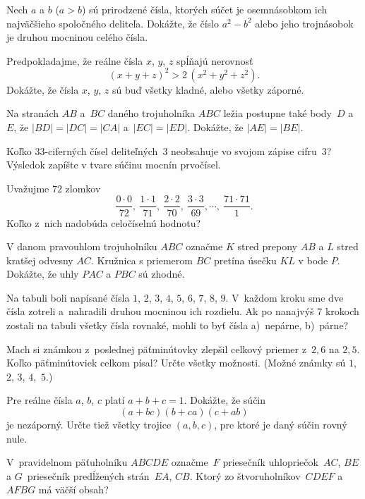 {%
Nech $a$ a $b$ ($a>b$) sú prirodzené čísla, ktorých súčet je osemnásobkom ich najväčšieho spoločného deliteľa. Dokážte, že číslo $a^2-b^2$ alebo jeho trojnásobok je druhou mocninou celého čísla.}

{%
Predpokladajme, že reálne čísla $x$, $y$, $z$ spĺňajú nerovnosť
$$
(x+y+z)^2>2\,(x^2+y^2+z^2).
$$
Dokážte, že čísla $x$, $y$, $z$ sú buď všetky kladné, alebo všetky
záporné.}

{%
Na stranách $AB$ a~$BC$ daného trojuholníka $ABC$ ležia postupne také body~$D$ a~$E$, že $|BD|=|DC|=|CA|$ a~$|EC|=|ED|$. Dokážte, že $|AE|=|BE|$.}

{%
Koľko $33$-ciferných čísel deliteľných~$3$ neobsahuje vo svojom zápise cifru~3? Výsledok zapíšte v tvare súčinu mocnín prvočísel.}

{%
Uvažujme $72$ zlomkov
$$ \frac{0\cdot 0}{72},\ \frac{1\cdot 1}{71},\ \frac{2\cdot 2}{70},\ \frac{3\cdot 3}{69}, \cdots,\ \frac{71\cdot 71}{1}.
$$
Koľko z~nich nadobúda celočíselnú hodnotu?}

{%
V danom pravouhlom trojuholníku $ABC$ označme $K$ stred prepony $AB$ a $L$ stred kratšej odvesny $AC$. Kružnica s priemerom $BC$ pretína úsečku $KL$ v bode $P$. Dokážte, že uhly $PAC$ a $PBC$ sú zhodné.}

{%
Na tabuli boli napísané čísla $1$, $2$, $3$, $4$, $5$, $6$, $7$, $8$, $9$. V~každom kroku sme dve čísla zotreli a~nahradili druhou mocninou ich rozdielu. Ak po nanajvýš 7 krokoch zostali na tabuli všetky čísla rovnaké, mohli to byť čísla
a)~nepárne, b)~párne?}

{%
Mach si známkou z~poslednej päťminútovky zlepšil celkový priemer z~$2{,}6$ na $2{,}5$. Koľko päťminútoviek celkom písal? Určte všetky možnosti. (Možné známky sú $1$, $2$, $3$, $4$,~$5$.)}

{%
Pre reálne čísla $a$, $b$, $c$ platí $a+b+c=1$. Dokážte, že súčin
$$
(a+bc)(b+ca)(c+ab)
$$
je nezáporný. Určte tiež všetky trojice $(a,b,c)$, pre ktoré je daný súčin rovný nule.}

{%
V~pravidelnom päťuholníku $ABCDE$ označme~$F$ priesečník uhlopriečok~$AC$, $BE$ a $G$~priesečník predĺžených strán~$EA$, $CB$. Ktorý zo štvoruholníkov~$CDEF$ a~$AFBG$ má väčší obsah?}

